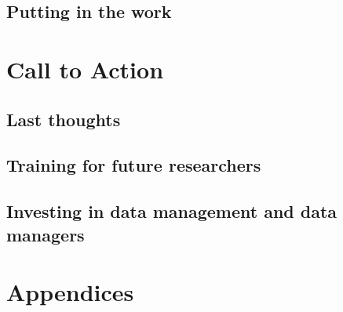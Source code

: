 \documentclass[
]{book}
\begin{document}
\hypertarget{putting-in-the-work}{%
\section{Putting in the work}\label{putting-in-the-work}}

\hypertarget{call-to-action}{%
\chapter{Call to Action}\label{call-to-action}}

\hypertarget{last-thoughts}{%
\section{Last thoughts}\label{last-thoughts}}

\hypertarget{training-for-future-researchers}{%
\section{Training for future researchers}\label{training-for-future-researchers}}

\hypertarget{investing-in-data-management-and-data-managers}{%
\section{Investing in data management and data managers}\label{investing-in-data-management-and-data-managers}}

\hypertarget{appendices}{%
\chapter{Appendices}\label{appendices}}
\end{document}
